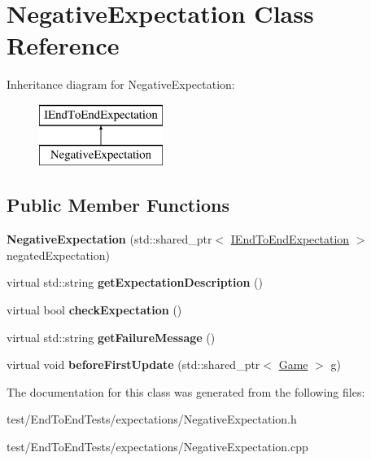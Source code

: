 \hypertarget{classNegativeExpectation}{}\section{Negative\+Expectation Class Reference}
\label{classNegativeExpectation}
Inheritance diagram for Negative\+Expectation\+:\begin{figure}[H]
\begin{center}
\leavevmode
\includegraphics[height=2.000000cm]{classNegativeExpectation}
\end{center}
\end{figure}
\subsection*{Public Member Functions}
\begin{DoxyCompactItemize}
\item 
{\bfseries Negative\+Expectation} (std\+::shared\+\_\+ptr$<$ \hyperlink{classIEndToEndExpectation}{I\+End\+To\+End\+Expectation} $>$ negated\+Expectation)\hypertarget{classNegativeExpectation_af61430eadf62ff0cdbab4b3b64ad5bcc}{}\label{classNegativeExpectation_af61430eadf62ff0cdbab4b3b64ad5bcc}

\item 
virtual std\+::string {\bfseries get\+Expectation\+Description} ()\hypertarget{classNegativeExpectation_ab424501c4fe211b7f44cfdd2df066398}{}\label{classNegativeExpectation_ab424501c4fe211b7f44cfdd2df066398}

\item 
virtual bool {\bfseries check\+Expectation} ()\hypertarget{classNegativeExpectation_a372ca04066a086d0d614d15c5d4cd97b}{}\label{classNegativeExpectation_a372ca04066a086d0d614d15c5d4cd97b}

\item 
virtual std\+::string {\bfseries get\+Failure\+Message} ()\hypertarget{classNegativeExpectation_adc7349347f7be98e1542b673c314dae9}{}\label{classNegativeExpectation_adc7349347f7be98e1542b673c314dae9}

\item 
virtual void {\bfseries before\+First\+Update} (std\+::shared\+\_\+ptr$<$ \hyperlink{classGame}{Game} $>$ g)\hypertarget{classNegativeExpectation_a054f47572610d8d5bc84ff7a39ec6b8f}{}\label{classNegativeExpectation_a054f47572610d8d5bc84ff7a39ec6b8f}

\end{DoxyCompactItemize}


The documentation for this class was generated from the following files\+:\begin{DoxyCompactItemize}
\item 
test/\+End\+To\+End\+Tests/expectations/Negative\+Expectation.\+h\item 
test/\+End\+To\+End\+Tests/expectations/Negative\+Expectation.\+cpp\end{DoxyCompactItemize}

